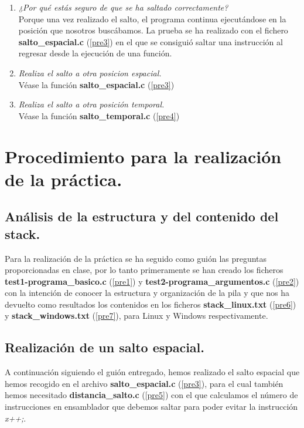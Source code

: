 \documentclass[12pt,a4paper,titlepage]{article}
\begin{document}
\begin{enumerate}
  \item \textit{¿Por qué estás seguro de que se ha saltado correctamente?}
  \\
Porque una vez realizado el salto, el programa continua ejecutándose en la posición que
nosotros buscábamos.
La prueba se ha realizado con el fichero \textbf{salto\_espacial.c} (\ref{pre3}) en el
que se consiguió saltar una instrucción al regresar desde la ejecución de una función.
  
  \item \textit{Realiza el salto a otra posicion espacial.}
  \\
  Véase la función \textbf{salto\_espacial.c} (\ref{pre3})
  
  \item \textit{Realiza el salto a otra posición temporal.}
  \\
  Véase la función \textbf{salto\_temporal.c} (\ref{pre4})
  
\end{enumerate}



\newpage


\section{Procedimiento para la realización de la práctica.}

\subsection{Análisis de la estructura y del contenido del stack.}
Para la realización de la práctica se ha seguido como guión las preguntas proporcionadas
en clase, por lo tanto primeramente se han creado los ficheros
\textbf{test1-programa\_basico.c} (\ref{pre1}) y \textbf{test2-programa\_argumentos.c}
(\ref{pre2}) con la intención de conocer la estructura y organización de la pila y que nos
ha devuelto como resultados los contenidos en los ficheros \textbf{stack\_linux.txt}
(\ref{pre6}) y \textbf{stack\_windows.txt} (\ref{pre7}), para Linux y Windows
respectivamente.


\subsection{Realización de un salto espacial.}
A continuación siguiendo el guión entregado, hemos realizado el salto espacial que hemos
recogido en el archivo \textbf{salto\_espacial.c} (\ref{pre3}),
para el cual también hemos necesitado \textbf{distancia\_salto.c} (\ref{pre5}) con el que
calculamos el número de instrucciones en ensamblador que debemos saltar para poder evitar
la instrucción 	\emph{x++;}.
\end{document}
